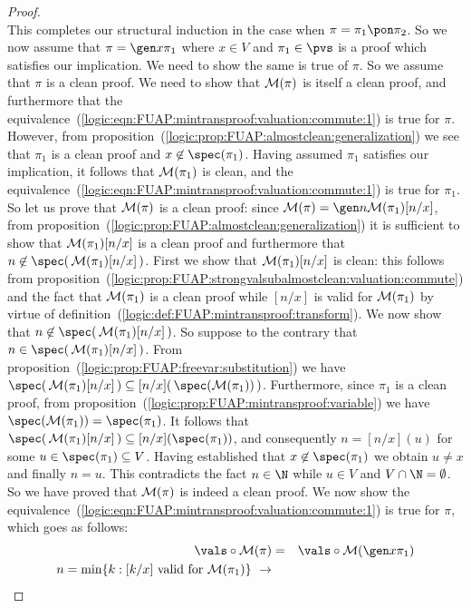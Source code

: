 \begin{proof}
\[    \]
This completes our structural induction in the case when
$\pi=\pi_{1}\pon\pi_{2}$. So we now assume that $\pi=\gen x\pi_{1}$
where $x\in V$ and $\pi_{1}\in\pvs$ is a proof which satisfies our
implication. We need to show the same is true of $\pi$. So we assume
that $\pi$ is a clean proof. We need to show that ${\cal M}(\pi)$ is
itself a clean proof, and furthermore that the
equivalence~(\ref{logic:eqn:FUAP:mintransproof:valuation:commute:1})
is true for $\pi$. However, from
proposition~(\ref{logic:prop:FUAP:almostclean:generalization}) we
see that $\pi_{1}$ is a clean proof and $x\not\in\spec(\pi_{1})$.
Having assumed $\pi_{1}$ satisfies our implication, it follows that
${\cal M}(\pi_{1})$ is clean, and the
equivalence~(\ref{logic:eqn:FUAP:mintransproof:valuation:commute:1})
is true for $\pi_{1}$. So let us prove that ${\cal M}(\pi)$ is a
clean proof: since ${\cal M}(\pi)=\gen n{\cal M}(\pi_{1})[n/x]$,
from proposition~(\ref{logic:prop:FUAP:almostclean:generalization})
it is sufficient to show that ${\cal M}(\pi_{1})[n/x]$ is a clean
proof and furthermore that $n\not\in\spec(\,{\cal
M}(\pi_{1})[n/x]\,)$. First we show that ${\cal M}(\pi_{1})[n/x]$ is
clean: this follows from
proposition~(\ref{logic:prop:FUAP:strongvalsubalmostclean:valuation:commute})
and the fact that ${\cal M}(\pi_{1})$ is a clean proof while $[n/x]$
is valid for ${\cal M}(\pi_{1})$ by virtue of
definition~(\ref{logic:def:FUAP:mintransproof:transform}). We now
show that $n\not\in\spec(\,{\cal M}(\pi_{1})[n/x]\,)$. So suppose to
the contrary that $n\in\spec(\,{\cal M}(\pi_{1})[n/x]\,)$. From
proposition~(\ref{logic:prop:FUAP:freevar:substitution}) we have
$\spec(\,{\cal M}(\pi_{1})[n/x]\,)\subseteq[n/x](\,\spec({\cal
M}(\pi_{1}))\,)$. Furthermore, since $\pi_{1}$ is a clean proof,
from proposition~(\ref{logic:prop:FUAP:mintransproof:variable}) we
have $ \spec({\cal M}(\pi_{1}))=\spec(\pi_{1})$. It follows that
$\spec(\,{\cal M}(\pi_{1})[n/x]\,)\subseteq[n/x](\spec(\pi_{1}))$,
and consequently $n=[n/x](u)$ for some $u\in\spec(\pi_{1})\subseteq
V$. Having established that $x\not\in\spec(\pi_{1})$ we obtain
$u\neq x$ and finally $n=u$. This contradicts the fact $n\in\N$
while $u\in V$ and $V\cap\N=\emptyset$. So we have proved that
${\cal M}(\pi)$ is indeed a clean proof. We now show the
equivalence~(\ref{logic:eqn:FUAP:mintransproof:valuation:commute:1})
is true for $\pi$, which goes as follows:
    \begin{eqnarray*}
    \vals\circ{\cal M}(\pi)&=&\vals\circ{\cal M}(\gen x\pi_{1})\\
    n=\min\{k:[k/x]\ \mbox{valid for}\ {\cal M}(\pi_{1})\}\ \rightarrow

\end{eqnarray*}
\end{proof}
